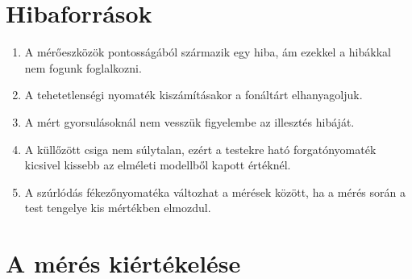 \documentclass[10pt,pdftex]{report}
\begin{document}
\section*{Hibaforrások}
\begin{enumerate}
    \item{A mérőeszközök pontosságából származik egy hiba, ám ezekkel a hibákkal nem fogunk foglalkozni.}
    \item{A tehetetlenségi nyomaték kiszámításakor a fonáltárt elhanyagoljuk.}
    \item{A mért gyorsulásoknál nem vesszük figyelembe az illesztés hibáját.}
    \item{A küllőzött csiga nem súlytalan, ezért a testekre ható forgatónyomaték kicsivel kissebb az elméleti modellből kapott értéknél.}
    \item{A szúrlódás fékezőnyomatéka változhat a mérések között, ha a mérés során a test tengelye kis mértékben elmozdul.}
\end{enumerate}
\section*{A mérés kiértékelése}
\end{document}
